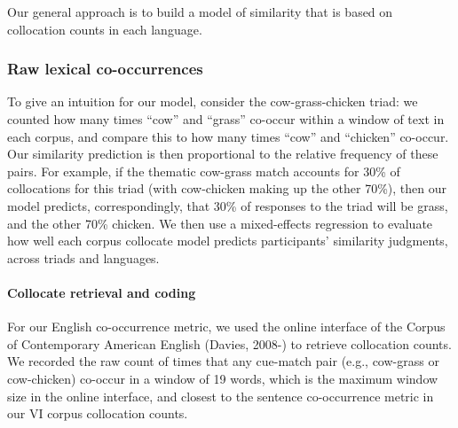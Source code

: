\documentclass[10pt, letterpaper]{article}
\begin{document}
Our general approach is to build a model of similarity that is based on
collocation counts in each language.

\hypertarget{raw-lexical-co-occurrences}{%
\subsubsection{Raw lexical
co-occurrences}\label{raw-lexical-co-occurrences}}

To give an intuition for our model, consider the cow-grass-chicken
triad: we counted how many times ``cow'' and ``grass'' co-occur within a
window of text in each corpus, and compare this to how many times
``cow'' and ``chicken'' co-occur. Our similarity prediction is then
proportional to the relative frequency of these pairs. For example, if
the thematic cow-grass match accounts for 30\% of collocations for this
triad (with cow-chicken making up the other 70\%), then our model
predicts, correspondingly, that 30\% of responses to the triad will be
grass, and the other 70\% chicken. We then use a mixed-effects
regression to evaluate how well each corpus collocate model predicts
participants' similarity judgments, across triads and languages.

\hypertarget{collocate-retrieval-and-coding}{%
\paragraph{Collocate retrieval and
coding}\label{collocate-retrieval-and-coding}}

For our English co-occurrence metric, we used the online interface of
the Corpus of Contemporary American English (Davies, 2008-) to retrieve
collocation counts. We recorded the raw count of times that any
cue-match pair (e.g., cow-grass or cow-chicken) co-occur in a window of
19 words, which is the maximum window size in the online interface, and
closest to the sentence co-occurrence metric in our VI corpus
collocation counts.
\end{document}

